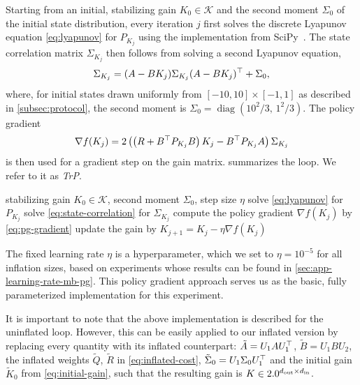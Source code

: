 Starting from an initial, stabilizing gain $K_0 \in \mathcal{K}$ and the second moment $\Sigma_0$ of the initial
state distribution, every iteration $j$ first solves the discrete Lyapunov equation \eqref{eq:lyapunov}
for $P_{K_j}$ using the implementation from SciPy~\cite{SciPy2026DiscLyapunov}. The state correlation matrix
$\Sigma_{K_j}$ then follows from solving a second Lyapunov equation,
\begin{equation}
    \label{eq:state-correlation}
    \Sigma_{K_j} = (A - B K_j) \Sigma_{K_j} (A - B K_j)^{\top} + \Sigma_0 ,
\end{equation}
where, for initial states drawn uniformly from $[-10, 10] \times [-1, 1]$ as described in \cref{subsec:protocol},
the second moment is $\Sigma_0 = \operatorname{diag}\left( 10^2/3, \, 1^2/3 \right)$. The policy gradient~\cite[Lemma~1]{Fazel2018Global}
\begin{equation}
    \label{eq:pg-gradient}
    \nabla f(K_j) = 2 \left( \left( R + B^{\top} P_{K_j} B \right) K_j - B^{\top} P_{K_j} A \right) \Sigma_{K_j}
\end{equation}
is then used for a gradient step on the gain matrix.  summarizes the loop. We refer to it as \emph{TrP}.
\begin{algorithm}[htbp]
    \caption{Model-based PG}
    \label{alg:mb-pg}
    \begin{algorithmic}[1]
        \REQUIRE stabilizing gain $K_0 \in \mathcal{K}$, second moment $\Sigma_0$, step size $\eta$
            \STATE solve \eqref{eq:lyapunov} for $P_{K_j}$
            \STATE solve \eqref{eq:state-correlation} for $\Sigma_{K_j}$
            \STATE compute the policy gradient $\nabla f(K_j)$ by \eqref{eq:pg-gradient}
            \STATE update the gain by $K_{j+1} = K_j - \eta \nabla f(K_j)$
        \ENDFOR
    \end{algorithmic}
\end{algorithm}

The fixed learning rate $\eta$ is a hyperparameter, which we set to $\eta = 10^{-5}$ for all inflation sizes, based on
experiments whose results can be found in \cref{sec:app-learning-rate-mb-pg}. This
policy gradient approach serves us as the basic, fully parameterized implementation for this experiment.

It is important to note that the above implementation is described for the uninflated loop. However,
this can be easily applied to our inflated version by replacing every quantity with its inflated counterpart: 
$\tilde{A} = U_1 A U_1^{\top}$, $\tilde{B} = U_1 B U_2$, the inflated weights $\tilde{Q}$, $\tilde{R}$ in
\eqref{eq:inflated-cost}, $\tilde{\Sigma}_0 = U_1 \Sigma_0 U_1^{\top}$ and the initial gain $\tilde{K}_0$ from \eqref{eq:initial-gain},
such that the resulting gain is $K \in 2.0^{d_{\mathrm{out}} \times d_{\mathrm{in}}}$.

